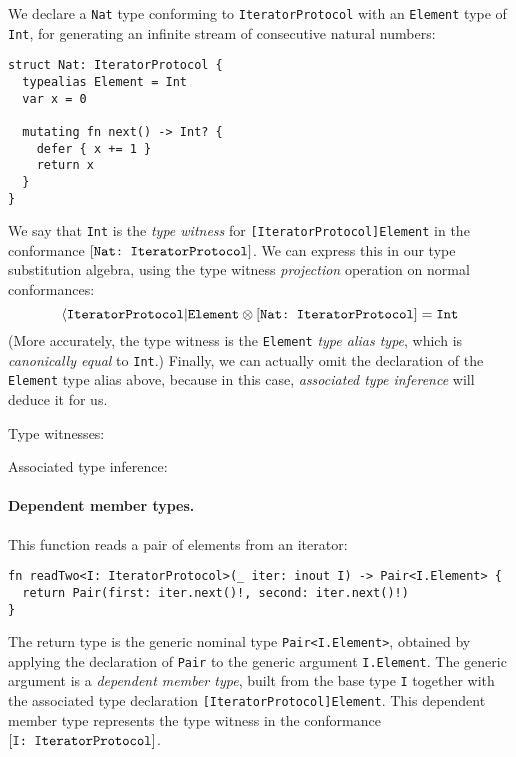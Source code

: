\documentclass[../generics]{subfiles}
\begin{document}
We declare a \texttt{Nat} type conforming to \texttt{IteratorProtocol} with an \texttt{Element} type of \texttt{Int}, for generating an infinite stream of consecutive natural numbers:
\begin{Verbatim}
struct Nat: IteratorProtocol {
  typealias Element = Int
  var x = 0
  
  mutating fn next() -> Int? {
    defer { x += 1 }
    return x
  }
}
\end{Verbatim}
We say that \texttt{Int} is the \emph{type witness} for \texttt{[IteratorProtocol]Element} in the conformance $[\texttt{Nat:~IteratorProtocol}]$. We can express this in our type substitution algebra, using the type witness \emph{projection} operation on normal conformances:
\[\langle\texttt{IteratorProtocol}|\texttt{Element}\otimes [\texttt{Nat:~IteratorProtocol}] = \texttt{Int}\]
(More accurately, the type witness is the \texttt{Element} \emph{type alias type}, which is \emph{canonically equal} to \texttt{Int}.) Finally, we can actually omit the declaration of the \texttt{Element} type alias above, because in this case, \emph{associated type inference} will deduce it for us.

\begin{MoreDetails}
\item Type witnesses: 
\item Associated type inference: 
\end{MoreDetails}

\paragraph{Dependent member types.} This function reads a pair of elements from an iterator:
\begin{Verbatim}
fn readTwo<I: IteratorProtocol>(_ iter: inout I) -> Pair<I.Element> {
  return Pair(first: iter.next()!, second: iter.next()!)
}
\end{Verbatim}
The return type is the generic nominal type \texttt{Pair<I.Element>}, obtained by applying the declaration of \texttt{Pair} to the generic argument \texttt{I.Element}. The generic argument is a \emph{dependent member type}, built from the base type \texttt{I} together with the associated type declaration \texttt{[IteratorProtocol]Element}. This dependent member type represents the type witness in the conformance $[\texttt{I:~IteratorProtocol}]$.
\end{document}
